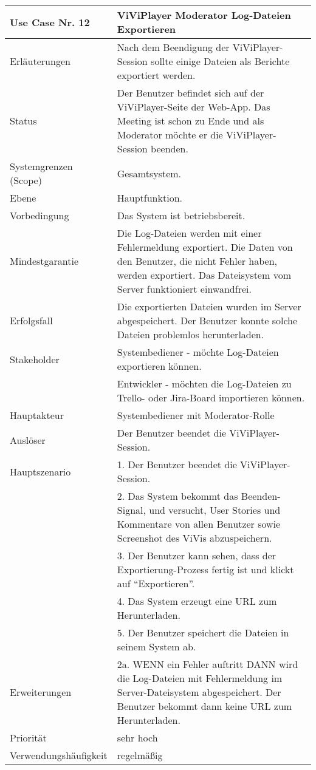 \begin{tabularx}{\linewidth}{|l|X|}
	\hline
	Use Case Nr. 12			& \textbf{ViViPlayer Moderator Log-Dateien Exportieren} \\ \hline
	Erläuterungen			& Nach dem Beendigung der ViViPlayer-Session sollte einige Dateien
							  als Berichte exportiert werden.\\ \hline
	Status					& Der Benutzer befindet sich auf der ViViPlayer-Seite der 
							  Web-App. Das Meeting ist schon zu Ende und als Moderator möchte er die ViViPlayer-Session beenden. \\ \hline
	Systemgrenzen (Scope)	& Gesamtsystem. \\ \hline
	Ebene					& Hauptfunktion. \\ \hline
	Vorbedingung			& Das System ist betriebsbereit.\\ \hline
	Mindestgarantie			& Die Log-Dateien werden mit einer Fehlermeldung exportiert. Die 
							  Daten von den Benutzer, die nicht Fehler haben, werden exportiert. Das Dateisystem vom Server funktioniert einwandfrei. \\ \hline
	Erfolgsfall				& Die exportierten Dateien wurden im Server abgespeichert. Der 
							  Benutzer konnte solche Dateien problemlos herunterladen. \\ \hline
	Stakeholder				& Systembediener - möchte Log-Dateien exportieren können.\\ 
							& Entwickler - möchten die Log-Dateien zu Trello- oder Jira-Board 
							  importieren können. \\ \hline
	Hauptakteur				& Systembediener mit Moderator-Rolle \\ \hline
	Auslöser				& Der Benutzer beendet die ViViPlayer-Session. \\ \hline	
	Hauptszenario			& 1. Der Benutzer beendet die ViViPlayer-Session. \\
							& 2. Das System bekommt das Beenden-Signal, und versucht, User 
							  Stories und Kommentare von allen Benutzer sowie Screenshot des ViVis abzuspeichern. \\
							& 3. Der Benutzer kann sehen, dass der Exportierung-Prozess 
							  fertig ist und klickt auf ``Exportieren''. \\
							& 4. Das System erzeugt eine URL zum Herunterladen. \\
							& 5. Der Benutzer speichert die Dateien in seinem System ab. \\ 
							  \hline
	Erweiterungen			& 2a. WENN ein Fehler auftritt DANN wird die Log-Dateien mit 
							  Fehlermeldung im Server-Dateisystem abgespeichert. Der Benutzer bekommt dann keine URL zum Herunterladen. \\ \hline
	Priorität				& sehr hoch \\ \hline
	Verwendungshäufigkeit	& regelmäßig \\ \hline
\end{tabularx}

